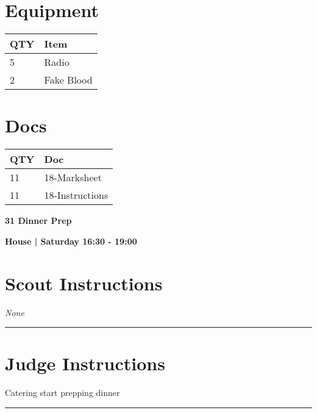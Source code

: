 \documentclass[10pt]{article}
\newcommand{\newtitle}[1]{\begin{center}{\Huge\bfseries #1 }\\ \vspace{5mm}\end{center}}
\newcommand{\newsubtitle}[1]{\begin{center}{\color{grey}\Large\bfseries #1 }\\ \vspace{5mm}\end{center}}
\begin{document}
	\begin{multicols}{2}

		\section*{\faWrench \: Equipment}

		
	\begin{center}
			\begin{tabular}{p{2cm}p{4cm}}


				\textbf{QTY} & \textbf{Item} \\\toprule
												5&Radio\\\midrule
												2&Fake Blood\\\midrule
								\end{tabular}

			\end{center}

		
		\vfill\null
		\columnbreak

			\section*{\faFile \: Docs}
		 	\begin{center}
			\begin{tabular}{p{2cm}p{4cm}}

			\textbf{QTY} & \textbf{Doc} \\\toprule
										11&18-Marksheet\\\midrule
										11&18-Instructions\\\midrule
							\end{tabular}
			\end{center}
	

		\vfill\null

		\end{multicols}



	\vspace{1cm}


	\clearpage
		\newtitle{31 Dinner Prep }
	\newsubtitle{House | Saturday 16:30 - 19:00}
		\setcounter{section}{30}
	\section*{Scout Instructions}
		\textit{None}
	
	\vspace{0.5cm}
	\hrule
	\vspace{0.5cm}

		\section*{Judge Instructions}
		Catering start prepping dinner
\vspace{0.5cm}
	\hrule
	\vspace{0.5cm}
\end{document}
